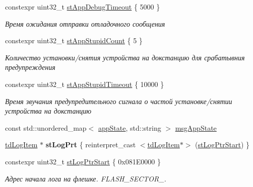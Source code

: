 \begin{DoxyCompactItemize}
constexpr uint32\+\_\+t \hyperlink{namespaceapp_a5d3e2252ee97a72dc9ab825375962ca1}{st\+App\+Debug\+Timeout} \{ 5000 \}
\begin{DoxyCompactList}\small\item\em Время ожидания отправки отладочного сообщения \end{DoxyCompactList}\item 
\mbox{\label{namespaceapp_ac66773c5708c0ae2af347be78db699dc}} 
constexpr uint32\+\_\+t \hyperlink{namespaceapp_ac66773c5708c0ae2af347be78db699dc}{st\+App\+Stupid\+Count} \{ 5 \}
\begin{DoxyCompactList}\small\item\em Количество установки/снятия устройства на докстанцию для срабатывния предупреждения \end{DoxyCompactList}\item 
\mbox{\label{namespaceapp_aa22274b71513535446ed3d8d3a7c1986}} 
constexpr uint32\+\_\+t \hyperlink{namespaceapp_aa22274b71513535446ed3d8d3a7c1986}{st\+App\+Stupid\+Timeout} \{ 10000 \}
\begin{DoxyCompactList}\small\item\em Время звучания предупредительного сигнала о частой установке/снятии устройства на докстанцию \end{DoxyCompactList}\item 
const std\+::unordered\+\_\+map$<$ \hyperlink{group___xD0_x9F_xD0_xB5_xD1_x80_xD0_xB5_xD1_x87_xD0_xB8_xD1_x81_xD0_xBB_xD0_xB5_xD0_xBD_xD0_xB8_xD1_x8F_ga290e8080c661e52c2f685fd4af148acf}{app\+State}, std\+::string $>$ \hyperlink{namespaceapp_a5731c1034c8fb7eaa43470e10aeff84c}{msg\+App\+State}
\item 
\mbox{\label{namespaceapp_adde92c19680f2dc5a6ae29197de21bea}} 
\hyperlink{structapp_1_1td_log_item}{td\+Log\+Item} $\ast$ {\bfseries st\+Log\+Prt} \{ reinterpret\+\_\+cast $<$\hyperlink{structapp_1_1td_log_item}{td\+Log\+Item}$\ast$$>$ (\hyperlink{namespaceapp_a3f8e7afc758e38727589ca05d9d0b1d7}{st\+Log\+Ptr\+Start}) \}
\item 
\mbox{\label{namespaceapp_a3f8e7afc758e38727589ca05d9d0b1d7}} 
constexpr uint32\+\_\+t \hyperlink{namespaceapp_a3f8e7afc758e38727589ca05d9d0b1d7}{st\+Log\+Ptr\+Start} \{ 0x081\+E0000 \}
\begin{DoxyCompactList}\small\item\em Адрес начала лога на флешке. F\+L\+A\+S\+H\+\_\+\+S\+E\+C\+T\+O\+R\+\_. \end{DoxyCompactList}\item 
$$
\end{DoxyCompactItemize}

